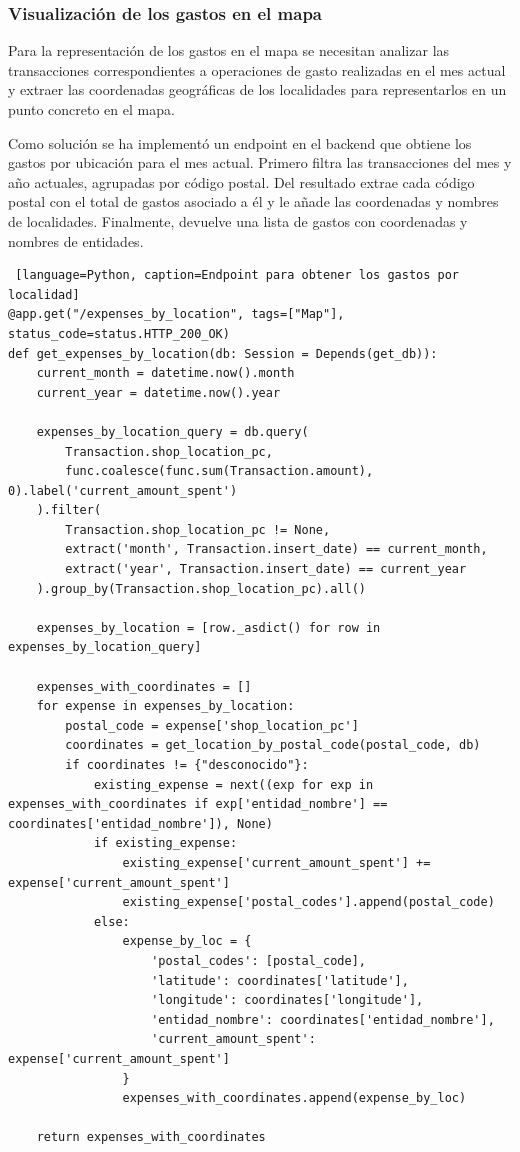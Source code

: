 \subsubsection{Visualización de los gastos en el mapa}
Para la representación de los gastos en el mapa se necesitan analizar las transacciones correspondientes a operaciones de gasto realizadas en el mes actual y extraer las coordenadas geográficas de los localidades para representarlos en un punto concreto en el mapa. 

Como solución se ha implementó un endpoint en el backend que obtiene los gastos por ubicación para el mes actual. Primero filtra las transacciones del mes y año actuales, agrupadas por código postal. Del resultado extrae cada código postal con el total de gastos asociado a él y le añade las coordenadas y nombres de localidades. Finalmente, devuelve una lista de gastos con coordenadas y nombres de entidades.

\begin{lstlisting} [language=Python, caption=Endpoint para obtener los gastos por localidad]
@app.get("/expenses_by_location", tags=["Map"], status_code=status.HTTP_200_OK)
def get_expenses_by_location(db: Session = Depends(get_db)):
    current_month = datetime.now().month
    current_year = datetime.now().year

    expenses_by_location_query = db.query(
        Transaction.shop_location_pc,
        func.coalesce(func.sum(Transaction.amount), 0).label('current_amount_spent')
    ).filter(
        Transaction.shop_location_pc != None,
        extract('month', Transaction.insert_date) == current_month,
        extract('year', Transaction.insert_date) == current_year
    ).group_by(Transaction.shop_location_pc).all()

    expenses_by_location = [row._asdict() for row in expenses_by_location_query]

    expenses_with_coordinates = []
    for expense in expenses_by_location:
        postal_code = expense['shop_location_pc']
        coordinates = get_location_by_postal_code(postal_code, db)
        if coordinates != {"desconocido"}:
            existing_expense = next((exp for exp in expenses_with_coordinates if exp['entidad_nombre'] == coordinates['entidad_nombre']), None)
            if existing_expense:
                existing_expense['current_amount_spent'] += expense['current_amount_spent']
                existing_expense['postal_codes'].append(postal_code)
            else:
                expense_by_loc = {
                    'postal_codes': [postal_code],
                    'latitude': coordinates['latitude'],
                    'longitude': coordinates['longitude'],
                    'entidad_nombre': coordinates['entidad_nombre'],
                    'current_amount_spent': expense['current_amount_spent']
                }
                expenses_with_coordinates.append(expense_by_loc)

    return expenses_with_coordinates
\end{lstlisting}

